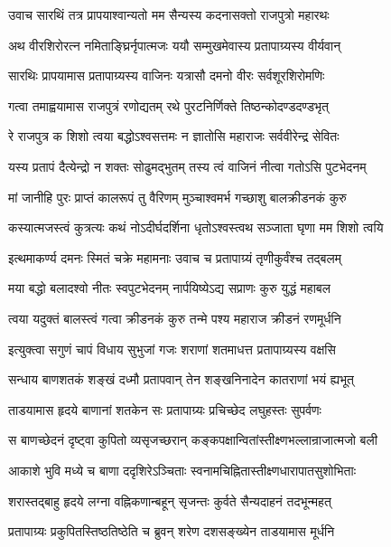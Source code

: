 \twolineshloka
{उवाच सारथिं तत्र प्रापयाश्वान्यतो मम}
{सैन्यस्य कदनासक्तो राजपुत्रो महारथः}%

\twolineshloka
{अथ वीरशिरोरत्न नमिताङ्घ्रिर्नृपात्मजः}
{ययौ सम्मुखमेवास्य प्रतापाग्र्यस्य वीर्यवान्}%

\twolineshloka
{सारथिः प्रापयामास प्रतापाग्र्यस्य वाजिनः}
{यत्रासौ दमनो वीरः सर्वशूरशिरोमणिः}%

\twolineshloka
{गत्वा तमाह्वयामास राजपुत्रं रणोद्यतम्}
{रथे पुरटनिर्णिक्ते तिष्ठन्कोदण्डदण्डभृत्}%

\twolineshloka
{रे राजपुत्र क शिशो त्वया बद्धोऽश्वसत्तमः}
{न ज्ञातोसि महाराजः सर्ववीरेन्द्र सेवितः}%

\twolineshloka
{यस्य प्रतापं दैत्येन्द्रो न शक्तः सोढुमद्भुतम्}
{तस्य त्वं वाजिनं नीत्वा गतोऽसि पुटभेदनम्}%

\twolineshloka
{मां जानीहि पुरः प्राप्तं कालरूपं तु वैरिणम्}
{मुञ्चाश्वमर्भ गच्छाशु बालक्रीडनकं कुरु}%

\twolineshloka
{कस्यात्मजस्त्वं कुत्रत्यः कथं नोऽदीर्घदर्शिना}
{धृतोऽश्वस्त्वथ सञ्जाता घृणा मम शिशो त्वयि}%

\twolineshloka
{इत्थमाकर्ण्य दमनः स्मितं चक्रे महामनाः}
{उवाच च प्रतापाग्र्यं तृणीकुर्वंश्च तद्बलम्}%


\twolineshloka
{मया बद्धो बलादश्वो नीतः स्वपुटभेदनम्}
{नार्पयिष्येऽद्य सप्राणः कुरु युद्धं महाबल}%

\twolineshloka
{त्वया यदुक्तं बालस्त्वं गत्वा क्रीडनकं कुरु}
{तन्मे पश्य महाराज क्रीडनं रणमूर्धनि}%


\twolineshloka
{इत्युक्त्वा सगुणं चापं विधाय सुभुजां गजः}
{शराणां शतमाधत्त प्रतापाग्र्यस्य वक्षसि}%

\twolineshloka
{सन्धाय बाणशतकं शङ्खं दध्मौ प्रतापवान्}
{तेन शङ्खनिनादेन कातराणां भयं ह्यभूत्}%

\twolineshloka
{ताडयामास हृदये बाणानां शतकेन सः}
{प्रतापाग्र्यः प्रचिच्छेद लघुहस्तः सुपर्वणः}%

\twolineshloka
{स बाणच्छेदनं दृष्ट्वा कुपितो व्यसृजच्छरान्}
{कङ्कपक्षान्वितांस्तीक्ष्णभल्लान्राजात्मजो बली}%

\twolineshloka
{आकाशे भुवि मध्ये च बाणा ददृशिरेऽञ्चिताः}
{स्वनामचिह्नितास्तीक्ष्णधारापातसुशोभिताः}%

\twolineshloka
{शरास्तद्बाहु हृदये लग्ना वह्निकणान्बहून्}
{सृजन्तः कुर्वते सैन्यदाहनं तदभून्महत्}%

\twolineshloka
{प्रतापाग्र्यः प्रकुपितस्तिष्ठतिष्ठेति च ब्रुवन्}
{शरेण दशसङ्ख्येन ताडयामास मूर्धनि}%

